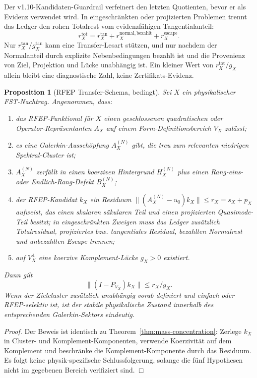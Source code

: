 \documentclass[11pt,a4paper]{article}
\theoremstyle{plain}
\newtheorem{proposition}[theorem]{Proposition}
\theoremstyle{definition}
\begin{document}
Der v1.10-Kandidaten-Guardrail verfeinert den letzten Quotienten, bevor er als
Evidenz verwendet wird. In eingeschränkten oder projizierten Problemen
trennt das Ledger den rohen Totalrest vom evidenzfähigen Tangentialanteil:
\[
  r_X^{\mathrm{tot}}
  =
  r_X^{\mathrm{tan}}
  + r_X^{\mathrm{normal,bezahlt}}
  + r_X^{\mathrm{escape}}.
\]
Nur $r_X^{\mathrm{tan}}/g_X^{\mathrm{tan}}$ kann eine Transfer-Lesart
stützen, und nur nachdem der Normalanteil durch explizite Nebenbedingungen
bezahlt ist und die Provenienz von Ziel, Projektion und Lücke unabhängig
ist. Ein kleiner Wert von $r_X^{\mathrm{tot}}/g_X$ allein bleibt eine
diagnostische Zahl, keine Zertifikats-Evidenz.

\begin{proposition}[RFEP Transfer-Schema, bedingt]
\label{prop:rfep-transfer-schema}
Sei $X$ ein physikalischer FST-Nachtrag. Angenommen, dass:
\begin{enumerate}[leftmargin=*]
\item das RFEP-Funktional für $X$ einen geschlossenen quadratischen oder
  Operator-Repräsentanten $A_X$ auf einem Form-Definitionsbereich $V_X$ zulässt;
\item es eine Galerkin-Ausschöpfung $A_X^{(N)}$ gibt, die treu zum
  relevanten niedrigen Spektral-Cluster ist;
\item $A_X^{(N)}$ zerfällt in einen koerziven Hintergrund $H_X^{(N)}$ plus einen
  Rang-eins- oder Endlich-Rang-Defekt $B_X^{(N)}$;
\item der RFEP-Kandidat $k_X$ ein Residuum
  $\|(A_X^{(N)}-u_0)k_X\|\le r_X=s_X+p_X$ aufweist, das einen skalaren säkularen
  Teil und einen projizierten Quasimode-Teil besitzt; in eingeschränkten
  Zweigen muss das Ledger zusätzlich Totalresidual, projiziertes bzw.
  tangentiales Residual, bezahlten Normalrest und unbezahlten Escape trennen;
\item auf $V_X^\perp$ eine koerzive Komplement-Lücke $g_X>0$ existiert.
\end{enumerate}
Dann gilt
\[
  \|(I-P_{V_X})k_X\|\le r_X/g_X.
\]
Wenn der Zielcluster zusätzlich unabhängig vorab definiert und einfach oder
RFEP-selektiv ist, ist der stabile physikalische Zustand innerhalb des
entsprechenden Galerkin-Sektors eindeutig.
\end{proposition}

\begin{proof}
Der Beweis ist identisch zu Theorem~\ref{thm:mass-concentration}:
Zerlege $k_X$ in Cluster- und Komplement-Komponenten, verwende Koerzivität
auf dem Komplement und beschränke die Komplement-Komponente durch das Residuum.
Es folgt keine physik-spezifische Schlussfolgerung, solange die fünf
Hypothesen nicht im gegebenen Bereich verifiziert sind.
\end{proof}
\end{document}
